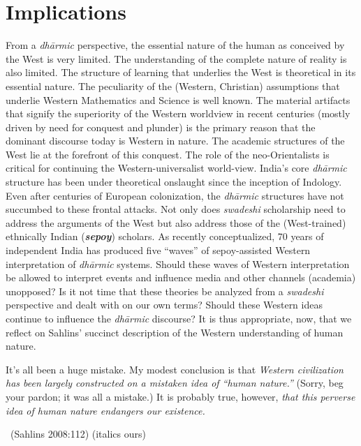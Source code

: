 \section*{Implications}

From a \textit{dhārmic} perspective, the essential nature of the human as conceived by the West is very limited. The understanding of the complete nature of reality is also limited. The structure of learning that underlies the West is theoretical in its essential nature. The peculiarity of the (Western, Christian) assumptions that underlie Western Mathematics and Science is well known. The material artifacts that signify the superiority of the Western worldview in recent centuries (mostly driven by need for conquest and plunder) is the primary reason that the dominant discourse today is Western in nature. The academic structures of the West lie at the forefront of this conquest. The role of the neo-Orientalists is critical for continuing the Western-universalist world-view. India's core \textit{dhārmic} structure has been under theoretical onslaught since the inception of Indology. Even after centuries of European colonization, the \textit{dhārmic} structures have not succumbed to these frontal attacks. Not only does \textit{swadeshi} scholarship need to address the arguments of the West but also address those of the (West-trained) ethnically Indian (\textbf{\textit{sepoy}}) scholars. As recently conceptualized, 70 years of independent India has produced five “waves” of sepoy-assisted Western interpretation of \textit{dhārmic} systems. Should these waves of Western interpretation be allowed to interpret events and influence media and other channels (academia) unopposed? Is it not time that these theories be analyzed from a \textit{swadeshi} perspective and dealt with on our own terms? Should these Western ideas continue to influence the \textit{dhārmic} discourse? It is thus appropriate, now, that we reflect on Sahlins' succinct description of the Western understanding of human nature.

\begin{myquote}
It's all been a huge mistake. My modest conclusion is that \textit{Western civilization has been largely constructed on a mistaken idea of “human nature.”} (Sorry, beg your pardon; it was all a mistake.) It is probably true, however, \textit{that this perverse idea of human nature endangers our existence.} 

~\hfill (Sahlins 2008:112) (italics ours)
\end{myquote}


